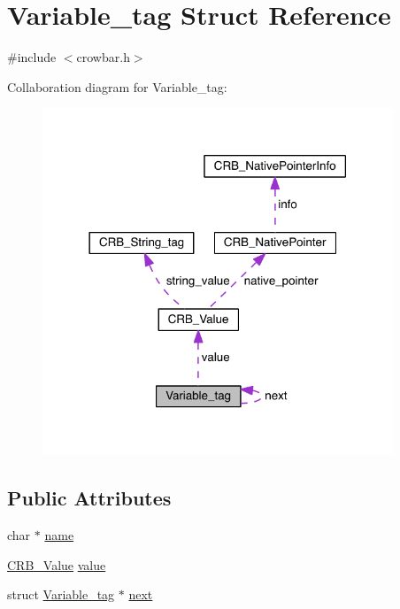 \hypertarget{struct_variable__tag}{}\section{Variable\+\_\+tag Struct Reference}
\label{struct_variable__tag}


{\ttfamily \#include $<$crowbar.\+h$>$}



Collaboration diagram for Variable\+\_\+tag\+:\nopagebreak
\begin{figure}[H]
\begin{center}
\leavevmode
\includegraphics[width=297pt]{struct_variable__tag__coll__graph}
\end{center}
\end{figure}
\subsection*{Public Attributes}
\begin{DoxyCompactItemize}
\item 
char $\ast$ \hyperlink{struct_variable__tag_a1af2d16a129d37300d04c8a182e73d2b}{name}
\item 
\hyperlink{struct_c_r_b___value}{C\+R\+B\+\_\+\+Value} \hyperlink{struct_variable__tag_a28da53976be439d10306ef7de2869cd9}{value}
\item 
struct \hyperlink{struct_variable__tag}{Variable\+\_\+tag} $\ast$ \hyperlink{struct_variable__tag_ae8081b0ed51372eaf9b8df2bb669f7a5}{next}
\end{DoxyCompactItemize}


